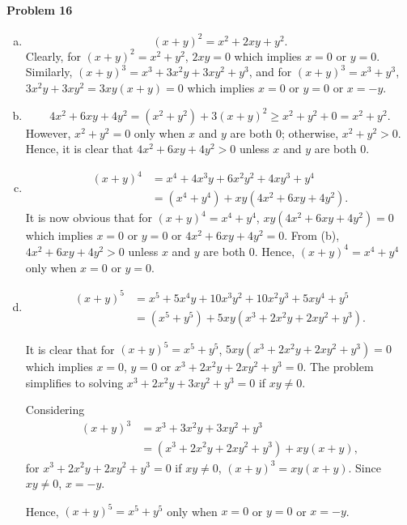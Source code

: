 \documentclass{article}
\begin{document}
\paragraph{Problem 16}
\begin{enumerate}[(a)]
  \item \[
      (x + y)^2 = x^2 + 2xy + y^2.
    \] Clearly, for $(x + y)^2 = x^2 + y^2$, $2xy = 0$ which implies $x = 0$ or
    $y = 0$. Similarly, $(x + y)^3 = x^3 + 3x^2y + 3xy^2 + y^3$, and for
    $(x + y)^3 = x^3 + y^3$, $3x^2y + 3xy^2 = 3xy(x + y) = 0$ which implies $x
    = 0$ or $y = 0$ or $x = -y$.
  \item \[
      4x^2 + 6xy + 4y^2 = (x^2 + y^2) + 3(x + y)^2 \geq x^2 + y^2 + 0 = x^2 +
      y^2.
    \] However, $x^2 + y^2 = 0$ only when $x$ and $y$ are both 0; otherwise,
    $x^2 + y^2 > 0$. Hence, it is clear that $4x^2 + 6xy + 4y^2 > 0$ unless $x$
    and $y$ are both 0.
  \item
    \begin{align*}
      (x + y)^4 &= x^4 + 4x^3y + 6x^2y^2 + 4xy^3 + y^4 \\
                &= (x^4 + y^4) + xy(4x^2 + 6xy + 4y^2).
    \end{align*}
    It is now obvious that for $(x + y)^4 = x^4 + y^4$, $xy(4x^2 + 6xy + 4y^2)
    = 0$ which implies $x = 0$ or $y = 0$ or $4x^2 + 6xy + 4y^2 = 0$. From (b),
    $4x^2 + 6xy + 4y^2 > 0$ unless $x$ and $y$ are both 0. Hence, $(x + y)^4 =
    x^4 + y^4$ only when $x = 0$ or $y = 0$.
  \item
    \begin{align*}
      (x + y)^5 &= x^5 + 5x^4y + 10x^3y^2 + 10x^2y^3 + 5xy^4 + y^5 \\
                &= (x^5 + y^5) + 5xy(x^3 + 2x^2y + 2xy^2 + y^3).
    \end{align*}

    It is clear that for $(x + y)^5 = x^5 + y^5$, $5xy(x^3 + 2x^2y + 2xy^2 +
    y^3) = 0$ which implies $x = 0$, $y = 0$ or $x^3 + 2x^2y + 2xy^2 + y^3 =
    0$. The problem simplifies to solving $x^3 + 2x^2y + 3xy^2 + y^3 = 0$ if
    $xy \neq 0$.

    Considering
    \begin{align*}
      (x + y)^3 &= x^3 + 3x^2y + 3xy^2 + y^3 \\
                &= (x^3 + 2x^2y + 2xy^2 + y^3) + xy(x + y),
    \end{align*}
    for $x^3 + 2x^2y + 2xy^2 + y^3 = 0$ if $xy \neq 0$, $(x + y)^3 = xy(x +
    y)$. Since $xy \neq 0$, $x = -y$.

    Hence, $(x + y)^5 = x^5 + y^5$ only when $x = 0$ or $y = 0$ or $x = -y$.
\end{enumerate}
\end{document}
